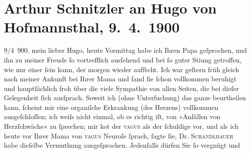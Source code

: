 

               \section[Arthur Schnitzler an Hugo von Hofmannsthal, 9. 4. 1900]{ Arthur Schnitzler an Hugo von Hofmannsthal, 9. 4. 1900}\nopagebreak{}\rehead{ }\begin{ledgroupsized}[t]{13cm}\normalsize\beginnumbering{} \toendnotes[C]{\smallbreak\pagebreak[2]} 
\toendnotes[C]{\smallbreak}\pstart
           \raggedleft{}{\pb}9/4 900. \pend
           \pstart
           mein lieber Hugo, heute Vormittag habe ich Ihren Papa geſprochen, und ihn zu meiner Freude ſo
               vortrefflich ausſehend und bei ſo guter Sti{\geminationm}ung
               getroffen, wie nur einer ſein kann, der morgen wieder aufſteht. Ich war geſtern
                  früh gleich nach meiner Ankunft bei Ihrer Mama und fand ſie ſchon vollkommen beruhigt
               und hauptſächlich froh über die viele Sympathie von allen Seiten, die bei dieſer
               Gelegenheit ſich ausſprach. {\pb}Soweit ich (ohne
               Unterſuchung) das ganze beurtheilen kann, ſcheint mir eine organiſche Erkrankung \introOben{}(des Herzens)\introOben{} vollkommen ausgeſchloſſen; ich weiſs nicht
               einmal, ob es richtig iſt, von »Anfällen von Herzſchwäche« zu ſprechen; mir ko{\geminationm}t der \textsc{vagus} als der ſchuldige
               vor, und als ich heute vor Ihrer Mama von \textsc{vagus} Neuroſe ſprach, ſagte ſie, Dr. \textsc{Schandlbauer} habe dieſelbe Vermuthung ausgeſprochen. Jedenfalls dürfen Sie ſo vergnügt und

\end{ledgroupsized}
